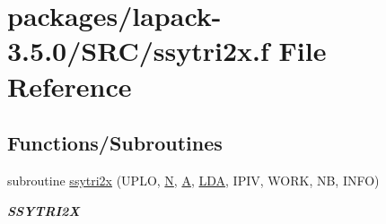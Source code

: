 \hypertarget{ssytri2x_8f}{}\section{packages/lapack-\/3.5.0/\+S\+R\+C/ssytri2x.f File Reference}
\label{ssytri2x_8f}
\subsection*{Functions/\+Subroutines}
\begin{DoxyCompactItemize}
\item 
subroutine \hyperlink{group__realSYcomputational_ga34537bed5f8e070371776e65dd14fd16}{ssytri2x} (U\+P\+L\+O, \hyperlink{polmisc_8c_a0240ac851181b84ac374872dc5434ee4}{N}, \hyperlink{classA}{A}, \hyperlink{example__user_8c_ae946da542ce0db94dced19b2ecefd1aa}{L\+D\+A}, I\+P\+I\+V, W\+O\+R\+K, N\+B, I\+N\+F\+O)
\begin{DoxyCompactList}\small\item\em {\bfseries S\+S\+Y\+T\+R\+I2\+X} \end{DoxyCompactList}\end{DoxyCompactItemize}
